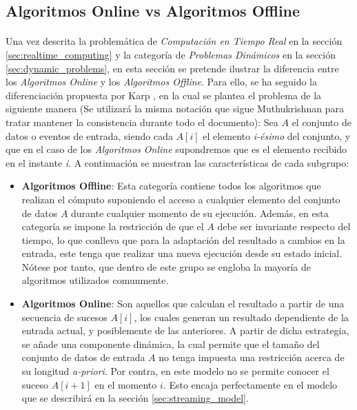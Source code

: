 \documentclass{subfiles}
\begin{document}
      \subsection{Algoritmos Online vs Algoritmos Offline}

        \paragraph{}
        Una vez descrita la problemática de \emph{Computación en Tiempo Real} en la sección \ref{sec:realtime_computing} y la categoría de \emph{Problemas Dinámicos} en la sección \ref{sec:dynamic_problems}, en esta sección se pretende ilustrar la diferencia entre los \emph{Algoritmos Online} y los \emph{Algoritmos Offline}. Para ello, se ha seguido la diferenciación propuesta por Karp \cite{Karp:1992:OAV:645569.659725}, en la cual se plantea el problema de la siguiente manera (Se utilizará la misma notación que sigue Muthukrishnan\cite{Muthukrishnan:2005:DSA:1166409.1166410} para tratar mantener la consistencia durante todo el documento): Sea $A$ el conjunto de datos o eventos de entrada, siendo cada $A[i]$ el elemento \emph{i-ésimo} del conjunto, y que en el caso de los \emph{Algoritmos Online} supondremos que es el elemento recibido en el instante \emph{i}. A continuación se muestran las características de cada subgrupo:

        \begin{itemize}
          \item \textbf{Algoritmos Offline}: Esta categoría contiene todos los algoritmos que realizan el cómputo suponiendo el acceso a cualquier elemento del conjunto de datos $A$ durante cualquier momento de su ejecución. Además, en esta categoría se impone la restricción de que el $A$ debe ser invariante respecto del tiempo, lo que conlleva que para la adaptación del resultado a cambios en la entrada, este tenga que realizar una nueva ejecución desde su estado inicial. Nótese por tanto, que dentro de este grupo se engloba la mayoría de algoritmos utilizados comunmente.

          \item \textbf{Algoritmos Online}: Son aquellos que calculan el resultado a partir de una secuencia de sucesos $A[i]$, los cuales generan un resultado dependiente de la entrada actual, y posiblemente de las anteriores. A partir de dicha estrategia, se añade una componente dinámica, la cual permite que el tamaño del conjunto de datos de entrada $A$ no tenga impuesta una restricción acerca de su longitud \emph{a-priori}. Por contra, en este modelo no se permite conocer el suceso $A[i+1]$ en el momento $i$.  Esto encaja perfectamente en el modelo que se describirá en la sección \ref{sec:streaming_model}.

        \end{itemize}
\end{document}
